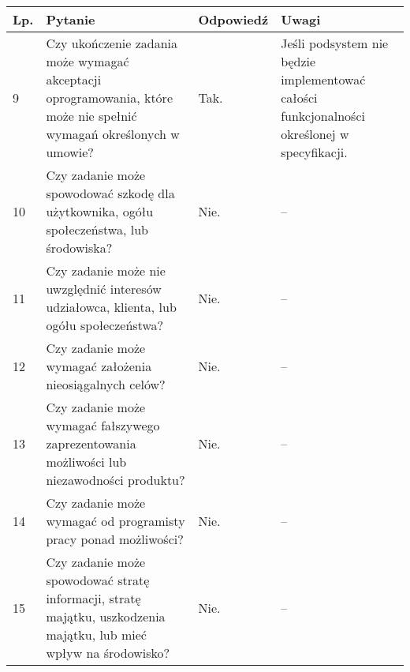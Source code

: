 \documentclass[11pt,oneside,a4paper,titlepage,onecolumn]{article}
\begin{document}
\begin{tabularx}{\textwidth}{|l|X|l|X|}
    \hline
    Lp. & Pytanie & Odpowiedź & Uwagi \\ \hline

	9
	& Czy ukończenie zadania może wymagać akceptacji oprogramowania, które może
    nie spełnić wymagań określonych w umowie?
	& Tak.
	& Jeśli podsystem nie będzie implementować całości funkcjonalności określonej
    w specyfikacji.
	\\\hline

	10
	& Czy zadanie może spowodować szkodę dla użytkownika, ogółu społeczeństwa, lub
    środowiska?
	& Nie.
	& --
	\\\hline

	11
	& Czy zadanie może nie uwzględnić interesów udziałowca, klienta, lub ogółu
    społeczeństwa?
	& Nie.
	& --
	\\\hline

	12
	& Czy zadanie może wymagać założenia nieosiągalnych celów?
	& Nie.
	& --
	\\\hline

	13
	& Czy zadanie może wymagać fałszywego zaprezentowania możliwości lub
    niezawodności produktu?
	& Nie.
	& --
	\\\hline

	14
	& Czy zadanie może wymagać od programisty pracy ponad możliwości?
	& Nie.
	& --
	\\\hline

	15
	& Czy zadanie może spowodować stratę informacji, stratę majątku, uszkodzenia
    majątku, lub mieć wpływ na środowisko?
	& Nie.
	& --
	\\\hline
\end{tabularx}
\end{document}
